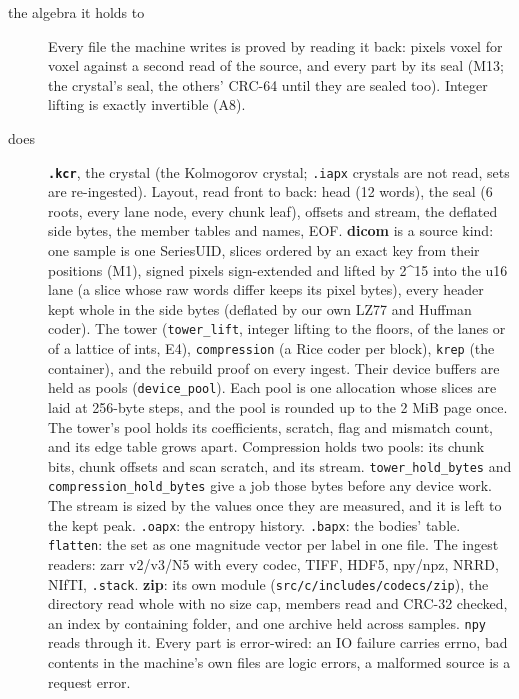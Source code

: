 \begin{description}
\item[{the algebra it holds to}] Every file the machine writes is proved by reading it back: pixels voxel for voxel against a second read of the source, and every part by its seal (M13; the crystal's seal, the others' CRC-64 until they are sealed too). Integer lifting is exactly invertible (A8).
\item[{does}] \textbf{\texttt{.\allowbreak{}kcr}}, the crystal (the Kolmogorov crystal; \texttt{.\allowbreak{}iapx} crystals are not read, sets are re-ingested). Layout, read front to back: head (12 words), the seal (6 roots, every lane node, every chunk leaf), offsets and stream, the deflated side bytes, the member tables and names, EOF. \textbf{dicom} is a source kind: one sample is one SeriesUID, slices ordered by an exact key from their positions (M1), signed pixels sign-extended and lifted by 2\textasciicircum{}15 into the u16 lane (a slice whose raw words differ keeps its pixel bytes), every header kept whole in the side bytes (deflated by our own LZ77 and Huffman coder). The tower (\texttt{tower\_\allowbreak{}lift}, integer lifting to the floors, of the lanes or of a lattice of ints, E4), \texttt{compression} (a Rice coder per block), \texttt{krep} (the container), and the rebuild proof on every ingest. Their device buffers are held as pools (\texttt{device\_\allowbreak{}pool}). Each pool is one allocation whose slices are laid at 256-byte steps, and the pool is rounded up to the 2 MiB page once. The tower's pool holds its coefficients, scratch, flag and mismatch count, and its edge table grows apart. Compression holds two pools: its chunk bits, chunk offsets and scan scratch, and its stream. \texttt{tower\_\allowbreak{}hold\_\allowbreak{}bytes} and \texttt{compression\_\allowbreak{}hold\_\allowbreak{}bytes} give a job those bytes before any device work. The stream is sized by the values once they are measured, and it is left to the kept peak. \texttt{.\allowbreak{}oapx}: the entropy history. \texttt{.\allowbreak{}bapx}: the bodies' table. \texttt{flatten}: the set as one magnitude vector per label in one file. The ingest readers: zarr v2/v3/N5 with every codec, TIFF, HDF5, npy/npz, NRRD, NIfTI, \texttt{.\allowbreak{}stack}. \textbf{zip}: its own module (\texttt{src/\allowbreak{}c/\allowbreak{}includes/\allowbreak{}codecs/\allowbreak{}zip}), the directory read whole with no size cap, members read and CRC-32 checked, an index by containing folder, and one archive held across samples. \texttt{npy} reads through it. Every part is error-wired: an IO failure carries errno, bad contents in the machine's own files are logic errors, a malformed source is a request error.

\end{description}
